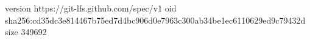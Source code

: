 version https://git-lfs.github.com/spec/v1
oid sha256:cd35dc3e814467b75ed7d4bc906d0e7963c300ab34be1ec6110629ed9c79432d
size 349692
